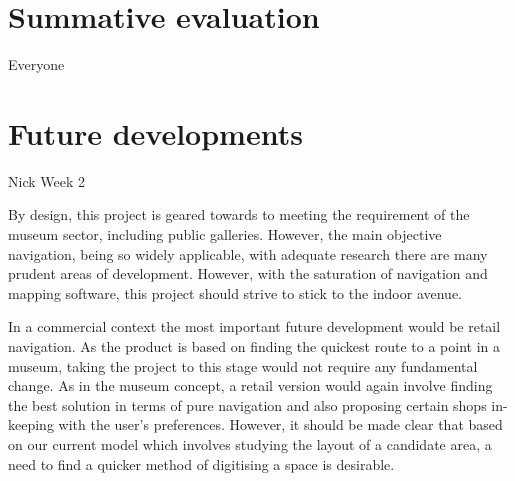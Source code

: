 \section{Summative evaluation}
Everyone

\section{Future developments}
Nick Week 2

By design, this project is geared towards to meeting the requirement of the museum sector, including public galleries. However, the main objective navigation, being so widely applicable, with adequate research there are many prudent areas of development. However, with the saturation of navigation and mapping software, this project should strive to stick to the indoor avenue. 

In a commercial context the most important future development would be retail navigation. As the product is based on finding the quickest route to a point in a museum, taking the project to this stage would not require any fundamental change. As in the museum concept, a retail version would again involve finding the best solution in terms of pure navigation and also proposing certain shops in-keeping with the user’s preferences. However, it should be made clear that based on our current model which involves studying the layout of a candidate area, a need to find a quicker method of digitising a space is desirable. 


